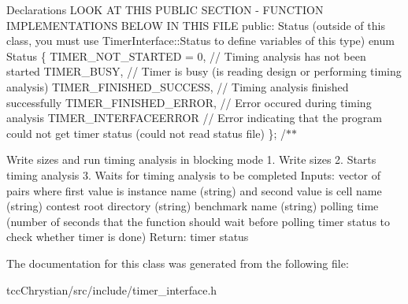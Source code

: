 Declarations L\-O\-O\-K A\-T T\-H\-I\-S P\-U\-B\-L\-I\-C S\-E\-C\-T\-I\-O\-N -\/ F\-U\-N\-C\-T\-I\-O\-N I\-M\-P\-L\-E\-M\-E\-N\-T\-A\-T\-I\-O\-N\-S B\-E\-L\-O\-W I\-N T\-H\-I\-S F\-I\-L\-E public\-: Status (outside of this class, you must use Timer\-Interface\-::\-Status to define variables of this type) enum Status \{ T\-I\-M\-E\-R\-\_\-\-N\-O\-T\-\_\-\-S\-T\-A\-R\-T\-E\-D = 0, // Timing analysis has not been started T\-I\-M\-E\-R\-\_\-\-B\-U\-S\-Y, // Timer is busy (is reading design or performing timing analysis) T\-I\-M\-E\-R\-\_\-\-F\-I\-N\-I\-S\-H\-E\-D\-\_\-\-S\-U\-C\-C\-E\-S\-S, // Timing analysis finished successfully T\-I\-M\-E\-R\-\_\-\-F\-I\-N\-I\-S\-H\-E\-D\-\_\-\-E\-R\-R\-O\-R, // Error occured during timing analysis T\-I\-M\-E\-R\-\_\-\-I\-N\-T\-E\-R\-F\-A\-C\-E\-E\-R\-R\-O\-R // Error indicating that the program could not get timer status (could not read status file) \}; /$\ast$$\ast$

\begin{DoxyVerb}Write sizes and run timing analysis in blocking mode
1. Write sizes
2. Starts timing analysis
3. Waits for timing analysis to be completed
Inputs: vector of pairs where first value is instance name (string) and second value is cell name (string)
        contest root directory (string)
        benchmark name (string)
        polling time (number of seconds that the function should wait before polling timer status to check whether timer is done)
Return: timer status\end{DoxyVerb}
 

The documentation for this class was generated from the following file\-:\begin{DoxyCompactItemize}
\item 
tcc\-Chrystian/src/include/timer\-\_\-interface.\-h\end{DoxyCompactItemize}
